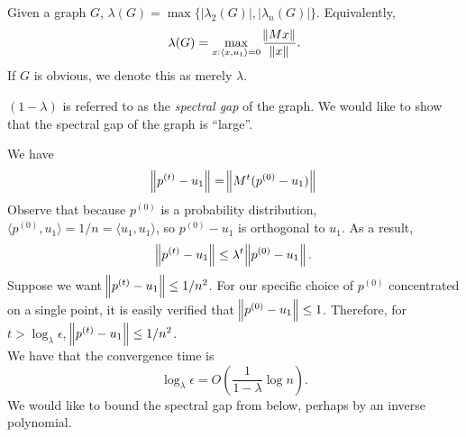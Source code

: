 			\begin{fdef}
				Given a graph $G$, $\lambda(G) = \max\{|\lambda_2(G)|,|\lambda_n(G)|\}$. Equivalently,
				\[ \lambda(G) = \max_{x : \langle x,u_1\rangle = 0} \frac{\norm{Mx}}{\norm{x}}. \]
				If $G$ is obvious, we denote this as merely $\lambda$.
			\end{fdef}
			 $(1-\lambda)$ is referred to as the \emph{spectral gap} of the graph. We would like to show that the spectral gap of the graph is ``large''.

			We have
			\[ \norm{p^{(t)} - u_1} = \norm{M^t (p^{(0)} - u_1)} \]
			Observe that because $p^{(0)}$ is a probability distribution, $\langle p^{(0)} , u_1 \rangle = 1/n = \langle u_1,u_1 \rangle$, so $p^{(0)}-u_1$ is orthogonal to $u_1$. As a result,
			\[ \norm{p^{(t)} - u_1} \le \lambda^t \norm{p^{(0)} - u_1}. \]
			Suppose we want $\norm{p^{(t)} - u_1} \le 1/n^2$. For our specific choice of $p^{(0)}$ concentrated on a single point, it is easily verified that $\norm{p^{(0)} - u_1} \le 1$. Therefore, for $t > \log_{\lambda} \epsilon$, $\norm{p^{(t)} - u_1} \le 1/n^2$.\\
			We have that the convergence time is
			\[ \log_\lambda \epsilon = O\left( \frac{1}{1-\lambda} \log n \right). \]
			We would like to bound the spectral gap from below, perhaps by an inverse polynomial.\\

